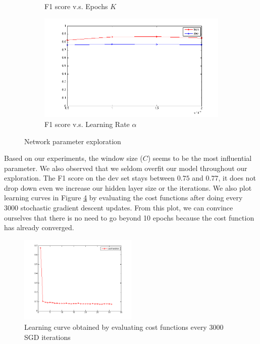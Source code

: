 \documentclass[letterpaper]{article}
\begin{document}
\begin{figure}[ht]
\begin{subfigure}{.5\textwidth}
  \caption{F1 score v.s. Epochs $K$}
  \label{fig:epoch}
\end{subfigure}%
\begin{subfigure}{.5\textwidth}
  \includegraphics[scale=0.5, width=1.0\linewidth]{alpha.png}
  \caption{F1 score v.s. Learning Rate $\alpha$}
  \label{fig:alpha}
\end{subfigure}
\caption{Network parameter exploration}
\label{fig:exploration}
\end{figure}
Based on our experiments, the window size ($C$) seems to be the most influential parameter. We also observed that we seldom overfit our model throughout our exploration. The F1 score on the dev set stays between $0.75$ and $0.77$, it does not drop down even we increase our hidden layer size or the iterations. We also plot learning curves in Figure \ref{fig:learning_curve} by evaluating the cost functions after doing every $3000$ stochastic gradient descent updates. From this plot, we can convince ourselves that there is no need to go beyond 10 epochs because the cost function has already converged.
\begin{figure}[ht]
\begin{center}
\includegraphics[width=0.5\textwidth]{curve.png}
\caption{Learning curve obtained by evaluating cost functions every $3000$ SGD iterations}
\label{fig:learning_curve}
\end{center}
\end{figure}
\end{document}

